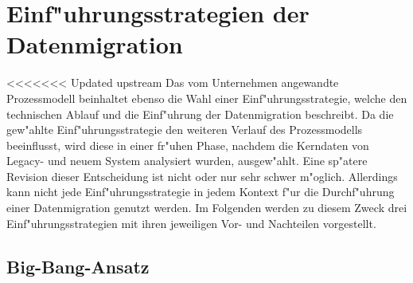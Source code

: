 \section{Einf"uhrungsstrategien der Datenmigration}
\label{chapter:vorgehensweisen}


<<<<<<< Updated upstream
Das vom Unternehmen angewandte Prozessmodell beinhaltet ebenso die Wahl einer Einf"uhrungsstrategie, welche den technischen Ablauf und die Einf"uhrung der Datenmigration beschreibt. Da die gew"ahlte Einf"uhrungsstrategie den weiteren Verlauf des Prozessmodells beeinflusst, wird diese in einer fr"uhen Phase, nachdem die Kerndaten von Legacy- und neuem System analysiert wurden, ausgew"ahlt. Eine sp"atere Revision dieser Entscheidung ist nicht oder nur sehr schwer m"oglich. Allerdings kann nicht jede Einf"uhrungsstrategie in jedem Kontext f"ur die Durchf"uhrung einer Datenmigration genutzt werden. Im Folgenden werden zu diesem Zweck drei Einf"uhrungsstrategien mit ihren jeweiligen Vor- und Nachteilen vorgestellt. 

\subsection{Big-Bang-Ansatz}

